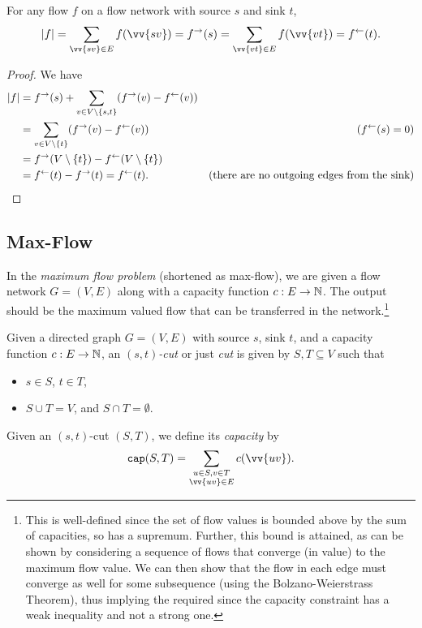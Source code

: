 	\begin{lemma}
		For any flow $f$ on a flow network with source $s$ and sink $t$,
		\[ |f| = \sum_{\vv{sv}\in E}f(\vv{sv}) = f^{\to}(s) = \sum_{\vv{vt}\in E}f(\vv{vt}) = f^{\ot}(t). \]
	\end{lemma}
	\begin{proof}
		We have
		\begin{align*}
			|f| &= f^{\to}(s) + \sum_{v\in V\setminus\{s,t\}} (f^\to(v) - f^\leftarrow(v)) \\
				&= \sum_{v\in V\setminus \{t\}} (f^\to(v) - f^\leftarrow(v)) & (f^\leftarrow(s)=0) \\
				&= f^\to(V\setminus\{t\}) - f^\leftarrow(V\setminus\{t\}) \\
				&= f^\leftarrow(t) - f^\to(t) = f^\leftarrow(t). & (\text{there are no outgoing edges from the sink})
		\end{align*}
	\end{proof}

\subsection{Max-Flow}

	In the \textit{maximum flow problem} (shortened as max-flow), we are given a flow network $G=(V,E)$ along with a capacity function $c:E\to\mathbb{N}$. The output should be the maximum valued flow that can be transferred in the network.\footnote{This is well-defined since the set of flow values is bounded above by the sum of capacities, so has a supremum. Further, this bound is attained, as can be shown by considering a sequence of flows that converge (in value) to the maximum flow value. We can then show that the flow in each edge must converge as well for some subsequence (using the Bolzano-Weierstrass Theorem), thus implying the required since the capacity constraint has a weak inequality and not a strong one.}

	\begin{fdef}
		Given a directed graph $G=(V,E)$ with source $s$, sink $t$, and a capacity function $c:E\to\mathbb{N}$, an \textit{$(s,t)$-cut} or just \textit{cut} is given by $S,T\subseteq V$ such that
		\begin{itemize}
			\item $s\in S$, $t\in T$,
			\item $S\cup T=V$, and $S\cap T=\emptyset$.
		\end{itemize}
		Given an $(s,t)$-cut $(S,T)$, we define its \textit{capacity} by
		\[ \capp(S,T) = \sum_{\substack{u\in S, v\in T \\ \vv{uv}\in E}} c(\vv{uv}). \]
	\end{fdef}

